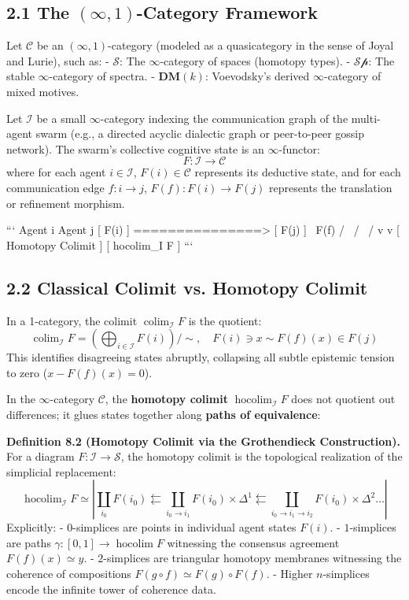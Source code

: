 \documentclass[11pt,twoside,openright]{amsbook}
\begin{document}
{{\subsection{2.1 The $(\infty, 1)$-Category Framework}
Let $\mathcal{C}$ be an $(\infty, 1)$-category (modeled as a quasicategory in the sense of Joyal and Lurie), such as:
- $\mathcal{S}$: The $\infty$-category of spaces (homotopy types).
- $\mathcal{Sp}$: The stable $\infty$-category of spectra.
- $\mathbf{DM}(k)$: Voevodsky’s derived $\infty$-category of mixed motives.

Let $\mathcal{I}$ be a small $\infty$-category indexing the communication graph of the multi-agent swarm (e.g., a directed acyclic dialectic graph or peer-to-peer gossip network). The swarm’s collective cognitive state is an $\infty$-functor:
$$F: \mathcal{I} \longrightarrow \mathcal{C}$$
where for each agent $i \in \mathcal{I}$, $F(i) \in \mathcal{C}$ represents its deductive state, and for each communication edge $f: i \to j$, $F(f): F(i) \to F(j)$ represents the translation or refinement morphism.

```
       Agent i                   Agent j
      [ F(i) ] ===============> [ F(j) ]
          \         F(f)         /
           \                    /
            \                  /
             v                v
            [ Homotopy Colimit ]
            [  hocolim_{I} F   ]
```

\subsection{2.2 Classical Colimit vs. Homotopy Colimit}
In a 1-category, the colimit $\operatorname{colim}_{\mathcal{I}} F$ is the quotient:
$$\operatorname{colim}_{\mathcal{I}} F = \left( \bigoplus_{i \in \mathcal{I}} F(i) \right) \Bigg/ \sim, \quad F(i) \ni x \sim F(f)(x) \in F(j)$$
This identifies disagreeing states abruptly, collapsing all subtle epistemic tension to zero ($x - F(f)(x) = 0$).

In the $\infty$-category $\mathcal{C}$, the \textbf{homotopy colimit} $\operatorname{hocolim}_{\mathcal{I}} F$ does not quotient out differences; it glues states together along \textbf{paths of equivalence}:

\textbf{Definition 8.2 (Homotopy Colimit via the Grothendieck Construction).} For a diagram $F: \mathcal{I} \to \mathcal{S}$, the homotopy colimit is the topological realization of the simplicial replacement:
$$\operatorname{hocolim}_{\mathcal{I}} F \simeq \left| \coprod_{i_0} F(i_0) \leftleftarrows \coprod_{i_0 \to i_1} F(i_0) \times \Delta^1 \leftleftarrows \coprod_{i_0 \to i_1 \to i_2} F(i_0) \times \Delta^2 \dots \right|$$
Explicitly:
- $0$-simplices are points in individual agent states $F(i)$.
- $1$-simplices are paths $\gamma: [0, 1] \to \operatorname{hocolim} F$ witnessing the consensus agreement $F(f)(x) \simeq y$.
- $2$-simplices are triangular homotopy membranes witnessing the coherence of compositions $F(g \circ f) \simeq F(g) \circ F(f)$.
- Higher $n$-simplices encode the infinite tower of coherence data.

}}
\end{document}
